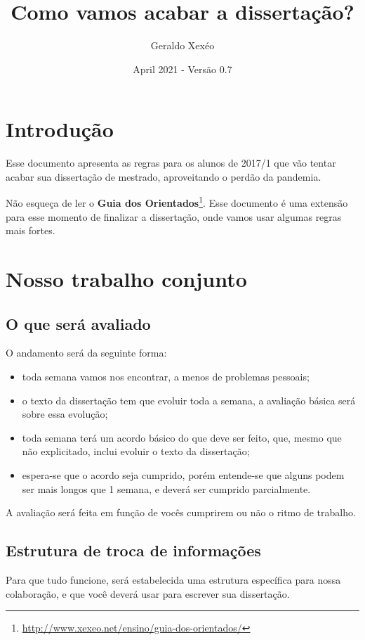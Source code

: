 \documentclass{article}
\title{Como vamos acabar a dissertação?}
\author{Geraldo Xexéo}
\date{April 2021 - Versão 0.7}
\begin{document}
\maketitle
\tableofcontents
\section{Introdução}

Esse documento apresenta as regras para os alunos de 2017/1 que vão tentar acabar sua dissertação de mestrado, aproveitando o perdão da pandemia.

Não esqueça de ler o \textbf{Guia dos Orientados}\footnote{\url{http://www.xexeo.net/ensino/guia-dos-orientados/}}. Esse documento é uma extensão para esse momento de finalizar a dissertação, onde vamos usar algumas regras mais fortes.

\section{Nosso trabalho conjunto}

\subsection{O que será avaliado}

O andamento será da seguinte forma:
\begin{itemize}
    \item toda semana vamos nos encontrar, a menos de problemas pessoais;
    \item o texto da dissertação tem que evoluir toda a semana, a avaliação básica será sobre essa evolução;
    \item toda semana terá um acordo básico do que deve ser feito, que, mesmo que não explicitado, inclui evoluir o texto da dissertação;
    \item espera-se que o acordo seja cumprido, porém entende-se que alguns podem ser mais longos que 1 semana, e deverá ser cumprido parcialmente.
\end{itemize}

A avaliação  será feita em função de vocês cumprirem ou não o ritmo de trabalho.

\subsection{Estrutura de troca de informações}

Para que tudo funcione, será estabelecida uma estrutura específica para nossa colaboração, e que você deverá usar para escrever sua dissertação.
\end{document}
